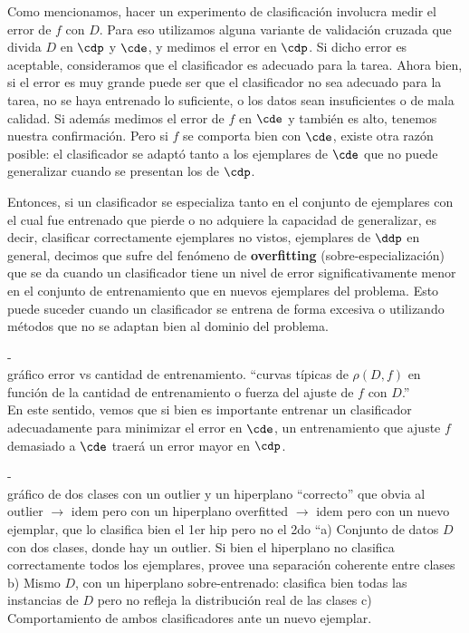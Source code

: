 Como mencionamos, hacer un experimento de clasificación involucra medir el error de $f$ con $D$. Para eso utilizamos alguna variante de validación cruzada que divida $D$ en $\cdp$ y $\cde$, y medimos el error en $\cdp$. Si dicho error es aceptable, consideramos que el clasificador es adecuado para la tarea. Ahora bien, si el error es muy grande puede ser que el clasificador no sea adecuado para la tarea, no se haya entrenado lo suficiente, o los datos sean insuficientes o de mala calidad. Si además medimos el error de $f$ en $\cde$ y también es alto, tenemos nuestra confirmación. Pero si $f$ se comporta bien con $\cde$, existe otra razón posible: el clasificador se adaptó tanto a los ejemplares de $\cde$ que no puede generalizar cuando se presentan los de $\cdp$.

Entonces, si un clasificador se especializa tanto en el conjunto de ejemplares con el cual fue entrenado que pierde o no adquiere la capacidad de generalizar, es decir, clasificar correctamente ejemplares no vistos, ejemplares de $\ddp$ en general, decimos que sufre del fenómeno de \textbf{overfitting} (sobre-especialización) que se da cuando un clasificador tiene un nivel de error significativamente menor en el conjunto de entrenamiento que en nuevos ejemplares del problema. Esto puede suceder cuando un clasificador se entrena de forma excesiva o utilizando métodos que no se adaptan bien al dominio del problema.

-\\gráfico error vs cantidad de entrenamiento.
``curvas típicas de $\rho(D,f)$ en función de la cantidad de entrenamiento o fuerza del ajuste de $f$ con $D$.''\\

En este sentido, vemos que si bien es importante entrenar un clasificador adecuadamente para minimizar el error en $\cde$, un entrenamiento que ajuste $f$ demasiado a $\cde$ traerá un error mayor en $\cdp$. 

-\\gráfico de dos clases con un outlier y un hiperplano ``correcto'' que obvia al outlier $\rightarrow$ idem pero con un hiperplano overfitted $\rightarrow$ idem pero con un nuevo ejemplar, que lo clasifica bien el 1er hip pero no el 2do
``a) Conjunto de datos $D$ con dos clases, donde hay un outlier. Si bien el hiperplano no clasifica correctamente todos los ejemplares, provee una separación coherente entre clases b) Mismo $D$, con un hiperplano sobre-entrenado: clasifica bien todas las instancias de $D$ pero no refleja la distribución real de las clases c) Comportamiento de ambos clasificadores ante un nuevo ejemplar.\\

